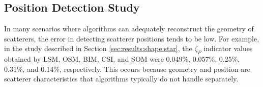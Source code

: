 \documentclass{IEEEtran}
\begin{document}
		
		\subsection{Position Detection Study}\label{sec:results:position}


            In many scenarios where algorithms can adequately reconstruct the geometry of scatterers, the error in detecting scatterer positions tends to be low. For example, in the study described in Section \ref{sec:results:shape:star}, the $\zeta_P$ indicator values obtained by LSM, OSM, BIM, CSI, and SOM were 0.049\%, 0.057\%, 0.25\%, 0.31\%, and 0.14\%, respectively. This occurs because geometry and position are scatterer characteristics that algorithms typically do not handle separately.
            
\end{document}
